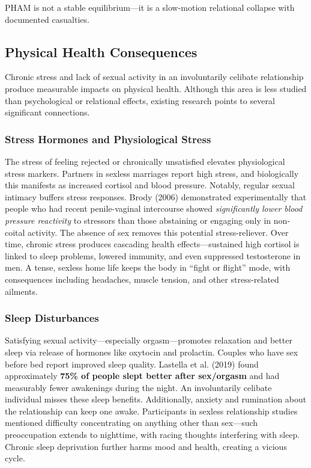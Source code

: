 \documentclass[12pt, letterpaper]{article}
\begin{document}
PHAM is not a stable equilibrium---it is a slow-motion relational collapse with documented casualties.

\subsection{Physical Health Consequences}

Chronic stress and lack of sexual activity in an involuntarily celibate relationship produce measurable impacts on physical health. Although this area is less studied than psychological or relational effects, existing research points to several significant connections.

\subsubsection{Stress Hormones and Physiological Stress}

The stress of feeling rejected or chronically unsatisfied elevates physiological stress markers. Partners in sexless marriages report high stress, and biologically this manifests as increased cortisol and blood pressure. Notably, regular sexual intimacy buffers stress responses. Brody (2006) demonstrated experimentally that people who had recent penile-vaginal intercourse showed \textit{significantly lower blood pressure reactivity} to stressors than those abstaining or engaging only in non-coital activity. The absence of sex removes this potential stress-reliever. Over time, chronic stress produces cascading health effects---sustained high cortisol is linked to sleep problems, lowered immunity, and even suppressed testosterone in men. A tense, sexless home life keeps the body in ``fight or flight'' mode, with consequences including headaches, muscle tension, and other stress-related ailments.

\subsubsection{Sleep Disturbances}

Satisfying sexual activity---especially orgasm---promotes relaxation and better sleep via release of hormones like oxytocin and prolactin. Couples who have sex before bed report improved sleep quality. Lastella et al. (2019) found approximately \textbf{75\% of people slept better after sex/orgasm} and had measurably fewer awakenings during the night. An involuntarily celibate individual misses these sleep benefits. Additionally, anxiety and rumination about the relationship can keep one awake. Participants in sexless relationship studies mentioned difficulty concentrating on anything other than sex---such preoccupation extends to nighttime, with racing thoughts interfering with sleep. Chronic sleep deprivation further harms mood and health, creating a vicious cycle.
\end{document}

